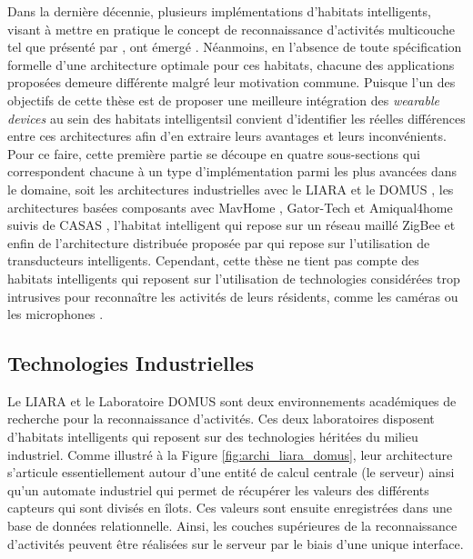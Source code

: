Dans la dernière décennie, plusieurs implémentations d'habitats intelligents, visant à mettre en pratique le concept de reconnaissance d'activités multicouche tel que présenté par \cite{Roy2013}, ont émergé \citep{DJCook2003, Helal2005, Giroux2009, Cook2013, Bouchard2014, Lago2017}. Néanmoins, en l'absence de toute spécification formelle d'une architecture optimale pour ces habitats, chacune des applications proposées demeure différente malgré leur motivation commune. Puisque l'un des objectifs de cette thèse est de proposer une meilleure intégration des \textit{wearable devices} au sein des habitats intelligents\textemdash il convient d'identifier les réelles différences entre ces architectures afin d'en extraire leurs avantages et leurs inconvénients. Pour ce faire, cette première partie se découpe en quatre sous-sections qui correspondent chacune à un type d'implémentation parmi les plus avancées dans le domaine, soit les architectures industrielles avec le \acs{LIARA} \citep{Bouchard2014} et le \acs{DOMUS} \citep{Giroux2009}, les architectures basées composants avec MavHome \citep{DJCook2003}, Gator-Tech \citep{Helal2005} et Amiqual4home \citep{Lago2017} suivis de CASAS \citep{Cook2013}, l'habitat intelligent qui repose sur un réseau maillé ZigBee et enfin de l'architecture distribuée proposée par \cite{Plantevin2018} qui repose sur l'utilisation de transducteurs intelligents. Cependant, cette thèse ne tient pas compte des habitats intelligents qui reposent sur l'utilisation de technologies considérées trop intrusives pour reconnaître les activités de leurs résidents, comme les caméras ou les microphones \citep{Brumitt2000, Vacher2011}.

\subsection{Technologies Industrielles}

Le \acs{LIARA} \citep{Bouchard2014} et le Laboratoire \acs{DOMUS} \citep{Giroux2009} sont deux environnements académiques de recherche pour la reconnaissance d'activités. Ces deux laboratoires disposent d'habitats intelligents qui reposent sur des technologies héritées du milieu industriel. Comme illustré à la Figure \ref{fig:archi_liara_domus}, leur architecture s'articule essentiellement autour d'une entité de calcul centrale (le serveur) ainsi qu'un automate industriel qui permet de récupérer les valeurs des différents capteurs qui sont divisés en îlots. Ces valeurs sont ensuite enregistrées dans une base de données relationnelle. Ainsi, les couches supérieures de la reconnaissance d'activités peuvent être réalisées sur le serveur par le biais d'une unique interface.

